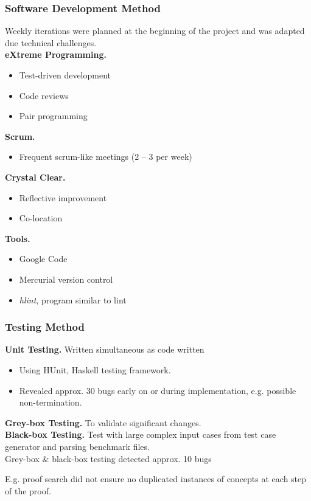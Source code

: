 \begin{frame}
  \frametitle{Software Development Method}
Weekly iterations were planned at the beginning of the project and was adapted due technical challenges.\\
\smallskip
\textbf{eXtreme Programming.}
\begin{itemize}
\item Test-driven development
\item Code reviews
\item Pair programming
\end{itemize}

\textbf{Scrum.}
\begin{itemize}
\item Frequent scrum-like meetings (2 -- 3 per week)
\end{itemize}

\textbf{Crystal Clear.}
\begin{itemize}
\item Reflective improvement
\item Co-location
\end{itemize}

\textbf{Tools.}
\begin{itemize}
\item Google Code
\item Mercurial version control
\item \textit{hlint}, program similar to lint
\end{itemize}
\end{frame}


\begin{frame}
  \frametitle{Testing Method}
\textbf{Unit Testing.} Written simultaneous as code written
\begin{itemize}
\item Using HUnit, Haskell testing framework.
\item Revealed approx. 30 bugs early on or during implementation, e.g. possible non-termination.
\end{itemize}
\bigskip
\textbf{Grey-box Testing.} To validate significant changes.\\
\bigskip
\textbf{Black-box Testing.} Test with large complex input cases from test case generator and parsing benchmark files.\\
\bigskip
Grey-box \& black-box testing detected approx. 10 bugs

E.g. proof search did not ensure no duplicated instances of concepts at each step of the proof.
\end{frame}


